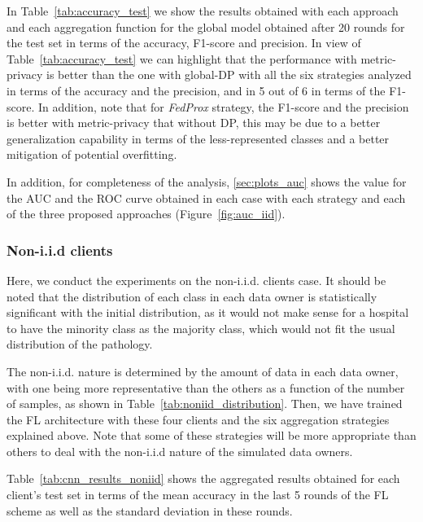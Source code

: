 \documentclass[5p,times]{elsarticle}
\begin{document}
In Table~\ref{tab:accuracy_test} we show the results obtained with each approach and each aggregation function for the global model obtained after 20 rounds for the test set in terms of the accuracy, F1-score and precision. In view of Table~\ref{tab:accuracy_test} we can highlight that the performance with metric-privacy is better than the one with global-DP with all the six strategies analyzed in terms of the accuracy and the precision, and in 5 out of 6 in terms of the F1-score. In addition, note that for \textit{FedProx} strategy, the F1-score and the precision is better with metric-privacy that without DP, this may be due to a better generalization capability in terms of the less-represented classes and a better mitigation of potential overfitting.

In addition, for completeness of the analysis, \ref{sec:plots_auc} shows the value for the AUC and the ROC curve obtained in each case with each strategy and each of the three proposed approaches (Figure~\ref{fig:auc_iid}).


\subsubsection{Non-i.i.d clients}\label{sec:results_noniid}

Here, we conduct the experiments on the non-i.i.d. clients case. 
It should be noted that the distribution of each class in each data owner is statistically significant with the initial distribution, as it would not make sense for a hospital to have the minority class as the majority class, which would not fit the usual distribution of the pathology.

The non-i.i.d. nature is determined by the amount of data in each data owner, with one being more representative than the others as a function of the number of samples, as shown in Table~\ref{tab:noniid_distribution}. Then, we have trained the FL architecture with these four clients and the six aggregation strategies explained above. Note that some of these strategies will be more appropriate than others to deal with the non-i.i.d nature of the simulated data owners. 

Table~\ref{tab:cnn_results_noniid} shows the aggregated results obtained for each client's test set in terms of the mean accuracy in the last 5 rounds of the FL scheme as well as the standard deviation in these rounds.
\end{document}
